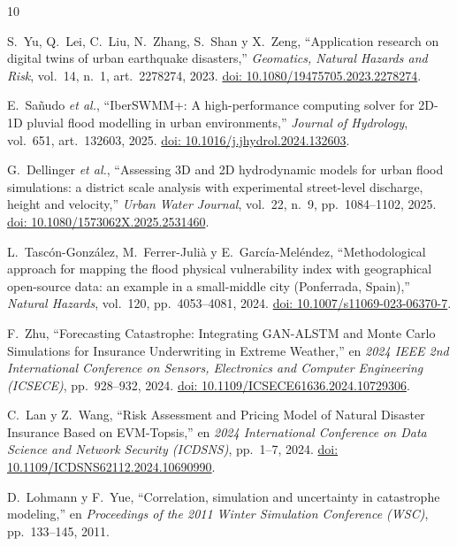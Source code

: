 \documentclass[journal]{IEEEtran}
\begin{document}
\begin{thebibliography}{10}

S.~Yu, Q.~Lei, C.~Liu, N.~Zhang, S.~Shan y X.~Zeng, ``Application research on digital twins of urban earthquake disasters,'' \emph{Geomatics, Natural Hazards and Risk}, vol.~14, n.\textordmasculine~1, art.~2278274, 2023. \href{https://doi.org/10.1080/19475705.2023.2278274}{doi: 10.1080/19475705.2023.2278274}.

E.~Sañudo \emph{et al.}, ``IberSWMM+: A high-performance computing solver for 2D-1D pluvial flood modelling in urban environments,'' \emph{Journal of Hydrology}, vol.~651, art.~132603, 2025. \href{https://doi.org/10.1016/j.jhydrol.2024.132603}{doi: 10.1016/j.jhydrol.2024.132603}.

G.~Dellinger \emph{et al.}, ``Assessing 3D and 2D hydrodynamic models for urban flood simulations: a district scale analysis with experimental street-level discharge, height and velocity,'' \emph{Urban Water Journal}, vol.~22, n.\textordmasculine~9, pp.~1084--1102, 2025. \href{https://doi.org/10.1080/1573062X.2025.2531460}{doi: 10.1080/1573062X.2025.2531460}.

L.~Tascón-González, M.~Ferrer-Julià y E.~García-Meléndez, ``Methodological approach for mapping the flood physical vulnerability index with geographical open-source data: an example in a small-middle city (Ponferrada, Spain),'' \emph{Natural Hazards}, vol.~120, pp.~4053--4081, 2024. \href{https://doi.org/10.1007/s11069-023-06370-7}{doi: 10.1007/s11069-023-06370-7}.

F.~Zhu, ``Forecasting Catastrophe: Integrating GAN-ALSTM and Monte Carlo Simulations for Insurance Underwriting in Extreme Weather,'' en \emph{2024 IEEE 2nd International Conference on Sensors, Electronics and Computer Engineering (ICSECE)}, pp.~928--932, 2024. \href{https://doi.org/10.1109/ICSECE61636.2024.10729306}{doi: 10.1109/ICSECE61636.2024.10729306}.

C.~Lan y Z.~Wang, ``Risk Assessment and Pricing Model of Natural Disaster Insurance Based on EVM-Topsis,'' en \emph{2024 International Conference on Data Science and Network Security (ICDSNS)}, pp.~1--7, 2024. \href{https://doi.org/10.1109/ICDSNS62112.2024.10690990}{doi: 10.1109/ICDSNS62112.2024.10690990}.

D.~Lohmann y F.~Yue, ``Correlation, simulation and uncertainty in catastrophe modeling,'' en \emph{Proceedings of the 2011 Winter Simulation Conference (WSC)}, pp.~133--145, 2011.


\end{thebibliography}
\end{document}
